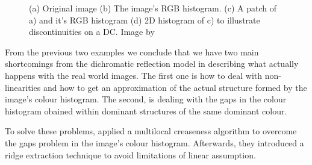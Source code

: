 \documentclass[twoside,11pt]{article}
\begin{document}
\begin{figure}[!t]
\centering
{}
\caption{(a) Original image (b) The image's RGB histogram. (c) A patch of a) and
it's RGB histogram (d) 2D histogram of c) to illustrate discontinuities on a DC.
Image by \cite{1478239}}
\label{fig:horse_all}
\end{figure}

From the previous two examples we conclude that we have two main shortcomings
from the dichromatic reflection model in describing what actually happens with
the real world images. The first one is how to deal with non-linearities and how
to get an approximation of the actual structure formed by the image's colour
histogram. The second, is dealing with the gaps in the colour histogram obained
within dominant structures of the same dominant colour.

To solve these problems, \cite{1478239} applied a multilocal creaseness
algorithm to overcome the gaps problem in the image's colour histogram.
Afterwards, they introduced a ridge extraction technique to avoid limitations of
linear assumption.
\end{document}
